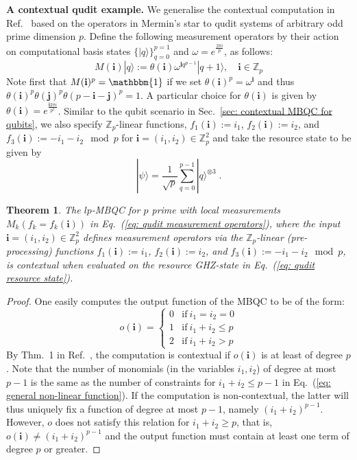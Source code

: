 \documentclass[aps,pra,letterpaper,onrcolumn,nofootinbib,notitlepage,longbibliography]{revtex4-1}
\newtheorem{theorem}{Theorem}
\newcommand{\one}{\mathbbm{1}}
\newcommand{\zz}{\mathbb Z}
\newcommand{\bi}{\mathbf{i}}
\newcommand{\bj}{\mathbf{j}}
\begin{document}
\textbf{A contextual qudit example.} We generalise the contextual computation in Ref.~\cite{AndersBrowne2009,Raussendorf2013} based on the operators in Mermin's star to qudit systems of arbitrary odd prime dimension $p$. Define the following measurement operators by their action on computational basis states $\{|q\rangle\}_{q=0}^{p=1}$ and $\omega=e^{\frac{2\pi i}{p}}$, as follows:
\begin{equation}\label{eq: qudit measurement operators}
    M(\bi)|q\rangle
    :=\theta(\bi)\omega^{\bi q^{p-1}} |q+1\rangle, \quad \bi\in\zz_p
\end{equation}
Note first that $M(\bi)^p=\one$ if we set $\theta(\bi)^p=\omega^\bi$ and thus $\theta(\bi)^p\theta(\bj)^p\theta(p-\bi-\bj)^p=1$. A particular choice for $\theta(\bi)$ is given by $\theta(\bi)=e^{\frac{\bi 2\pi i}{p^2}}$. Similar to the qubit scenario in Sec.~\ref{sec: contextual MBQC for qubits}, we also specify $\zz_p$-linear functions, $f_1(\mathbf{i}):=i_1$, $f_2(\mathbf{i}):=i_2$, and $f_3(\mathbf{i}):=-i_1-i_2\mod p$ for $\mathbf{i}=(i_1,i_2)\in\zz_p^2$ and take the resource state to be given by
\begin{equation}\label{eq: qudit resource state}
    |\psi\rangle
    =\frac{1}{\sqrt{p}} \sum_{q=0}^{p-1}|q\rangle^{\otimes 3}\; .
\end{equation}

\begin{theorem}\label{thm: AB qudit computation}
    The $lp$-MBQC for $p$ prime with local measurements $M_k(f_k=f_k(\mathbf{i}))$ in Eq.~(\ref{eq: qudit measurement operators}), where the input $\mathbf{i}=(i_1,i_2)\in\zz_p^2$ defines measurement operators via the $\zz_p$-linear (pre-processing) functions $f_1(\mathbf{i}):=i_1$, $f_2(\mathbf{i}):=i_2$, and $f_3(\mathbf{i}):=-i_1-i_2\mod p$, is contextual when evaluated on the resource GHZ-state in Eq.~(\ref{eq: qudit resource state}).
\end{theorem}

\begin{proof}
    One easily computes the output function of the MBQC to be of the form:
    \begin{equation}\label{eq: general non-linear function}
        o(\mathbf{i}) = \begin{cases} 0 &\mathrm{if} \ i_1=i_2=0 \\
        1 &\mathrm{if} \ i_1 + i_2 \leq p \\
        2 &\mathrm{if} \ i_1 + i_2 > p \end{cases}
    \end{equation}
    By Thm.~1 in Ref.~\cite{FrembsRobertsBartlett2018}, the computation is contextual if $o(\mathbf{i})$ is at least of degree $p$. Note that the number of monomials (in the variables $i_1,i_2$) of degree at most $p-1$ is the same as the number of constraints for $i_1+i_2 \leq p-1$ in Eq.~(\ref{eq: general non-linear function}). If the computation is non-contextual, the latter will thus uniquely fix a function of degree at most $p-1$, namely $(i_1+i_2)^{p-1}$. However, $o$ does not satisfy this relation for $i_1+i_2\geq p$, that is, $o(\bi)\neq (i_1+i_2)^{p-1}$ and the output function must contain at least one term of degree $p$ or greater.
\end{proof}
\end{document}
